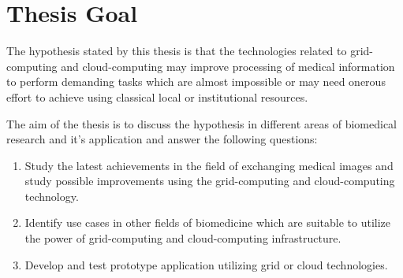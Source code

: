 \section{Thesis Goal}
The hypothesis stated by this thesis is that the technologies related to grid-computing and cloud-computing may  improve processing of medical information to perform demanding tasks which are almost impossible or may need onerous effort to achieve using classical local or institutional resources.
 
The aim of the thesis is to discuss the hypothesis in different areas of biomedical research and it's application and answer the following  questions:
\begin{enumerate}
\item	 Study the latest achievements in the field of exchanging medical images and study possible improvements using the grid-computing and cloud-computing technology.
\item Identify use cases in other fields of biomedicine which are suitable to utilize the power of grid-computing and cloud-computing infrastructure.
\item Develop and test prototype application utilizing grid or cloud technologies.
\end{enumerate}

